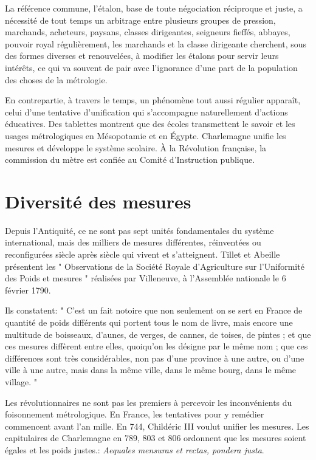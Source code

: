 La référence commune, l'étalon, base de toute négociation réciproque et juste, a nécessité de tout temps un arbitrage entre plusieurs groupes de pression, marchands, acheteurs, paysans, classes dirigeantes, seigneurs fieffés, abbayes, pouvoir royal régulièrement, les marchands et la classe dirigeante cherchent, sous des formes diverses et renouvelées, à modifier les étalons pour servir leurs intérêts, ce qui va souvent de pair avec l'ignorance d'une part de la population des choses de la métrologie.

En contrepartie, à travers le temps, un phénomène tout aussi régulier apparaît, celui d'une tentative d'unification qui s'accompagne naturellement d'actions éducatives.  Des tablettes montrent que des écoles transmettent le savoir et les usages métrologiques en Mésopotamie et en Égypte.  Charlemagne unifie les mesures et développe le système scolaire.  À la Révolution française, la commission du mètre est confiée au Comité d'Instruction publique.

\section{Diversité des mesures}

Depuis l'Antiquité, ce ne sont pas sept unités fondamentales du système international, mais des milliers de mesures différentes, réinventées ou reconfigurées siècle après siècle qui vivent et s'atteignent. Tillet et Abeille présentent les " Observations de la Société Royale d'Agriculture sur l'Uniformité des Poids et mesures " réalisées par Villeneuve, à l'Assemblée nationale le 6 février 1790.

Ils constatent: " C'est un fait notoire que non seulement on se sert en France de quantité de poids différents qui portent tous le nom de livre, mais encore une multitude de boisseaux, d'aunes, de verges, de cannes, de toises, de pintes ; et que ces mesures diffèrent entre elles, quoiqu'on les désigne par le même nom ; que ces différences sont très considérables, non pas d'une province à une autre, ou d'une ville à une autre, mais dans la même ville, dans le même bourg, dans le même village. "

Les révolutionnaires ne sont pas les premiers à percevoir les inconvénients du foisonnement métrologique.  En France, les tentatives pour y remédier commencent avant l'an mille.  En 744, Childéric III voulut unifier les mesures.  Les capitulaires de Charlemagne en 789, 803 et 806 ordonnent que les mesures soient égales et les poids justes.: \textit{Aequales mensuras et rectas, pondera justa}.

